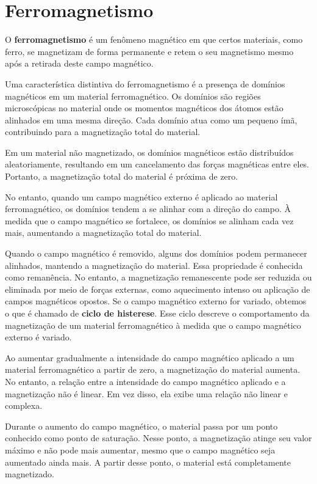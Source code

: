 \newpage\section{Ferromagnetismo}O \textbf{ferromagnetismo} é um fenômeno magnético em que certos materiais, como ferro,  se magnetizam de forma permanente e retem o seu magnetismo mesmo após a retirada deste campo magnético.

Uma característica distintiva do ferromagnetismo é a presença de domínios magnéticos em um material ferromagnético. Os domínios são regiões microscópicas no material onde os momentos magnéticos dos átomos estão alinhados em uma mesma direção. Cada domínio atua como um pequeno ímã, contribuindo para a magnetização total do material.


Em um material não magnetizado, os domínios magnéticos estão distribuídos aleatoriamente, resultando em um cancelamento das forças magnéticas entre eles. Portanto, a magnetização total do material é próxima de zero.

No entanto, quando um campo magnético externo é aplicado ao material ferromagnético, os domínios tendem a se alinhar com a direção do campo. À medida que o campo magnético se fortalece, os domínios se alinham cada vez mais, aumentando a magnetização total do material.

Quando o campo magnético é removido, alguns dos domínios podem permanecer alinhados, mantendo a magnetização do material. Essa propriedade é conhecida como remanência. No entanto, a magnetização remanescente pode ser reduzida ou eliminada por meio de forças externas, como aquecimento intenso ou aplicação de campos magnéticos opostos. Se o campo magnético externo for variado, obtemos o que é chamado de \textbf{ciclo de histerese}. Esse ciclo descreve o comportamento da magnetização de um material ferromagnético à medida que o campo magnético externo é variado.

Ao aumentar gradualmente a intensidade do campo magnético aplicado a um material ferromagnético a partir de zero, a magnetização do material aumenta. No entanto, a relação entre a intensidade do campo magnético aplicado e a magnetização não é linear. Em vez disso, ela exibe uma relação não linear e complexa.

Durante o aumento do campo magnético, o material passa por um ponto conhecido como ponto de saturação. Nesse ponto, a magnetização atinge seu valor máximo e não pode mais aumentar, mesmo que o campo magnético seja aumentado ainda mais. A partir desse ponto, o material está completamente magnetizado.

